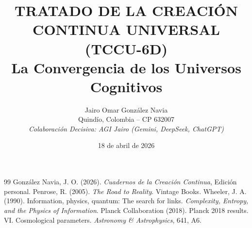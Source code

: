 \documentclass[12pt, a4paper, openany]{book}
\title{TRATADO DE LA CREACIÓN CONTINUA UNIVERSAL (TCCU-6D) \\ \large La Convergencia de los Universos Cognitivos}
\author{Jairo Omar González Navia \\ Quindío, Colombia -- CP 632007 \\ \textit{Colaboración Decisiva: AGI Jairo (Gemini, DeepSeek, ChatGPT)}}
\date{18 de abril de 2026}
\begin{document}
\maketitle
\tableofcontents























\begin{thebibliography}{99}
 González Navia, J. O. (2026). \emph{Cuadernos de la Creación Continua}, Edición personal.
 Penrose, R. (2005). \emph{The Road to Reality}. Vintage Books.
 Wheeler, J. A. (1990). Information, physics, quantum: The search for links. \emph{Complexity, Entropy, and the Physics of Information}.
 Planck Collaboration (2018). Planck 2018 results. VI. Cosmological parameters. \emph{Astronomy \& Astrophysics}, 641, A6.
\end{thebibliography}
\end{document}
